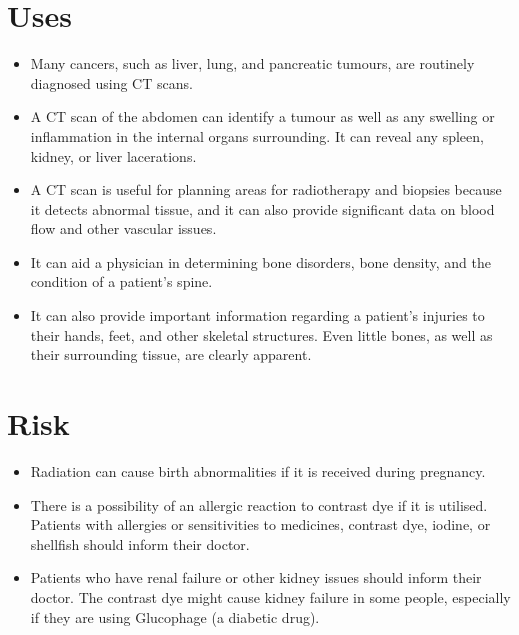 \documentclass[12pt]{article}
\begin{document}
\section*{ \huge Uses}
\large
\begin{itemize}


\item Many cancers, such as liver, lung, and pancreatic tumours, are routinely diagnosed using CT scans.

\item A CT scan of the abdomen can identify a tumour as well as any swelling or inflammation in the internal organs surrounding. It can reveal any spleen, kidney, or liver lacerations.


\item A CT scan is useful for planning areas for radiotherapy and biopsies because it detects abnormal tissue, and it can also provide significant data on blood flow and other vascular issues.

\item It can aid a physician in determining bone disorders, bone density, and the condition of a patient's spine.

\item It can also provide important information regarding a patient's injuries to their hands, feet, and other skeletal structures. Even little bones, as well as their surrounding tissue, are clearly apparent.



\end{itemize}



\section*{ \huge Risk}
\large
\begin{itemize}
\item Radiation can cause birth abnormalities if it is received during pregnancy.

\item There is a possibility of an allergic reaction to contrast dye if it is utilised. Patients with allergies or sensitivities to medicines, contrast dye, iodine, or shellfish should inform their doctor.


\item Patients who have renal failure or other kidney issues should inform their doctor. The contrast dye might cause kidney failure in some people, especially if they are using Glucophage (a diabetic drug).


\end{itemize}
\end{document}
